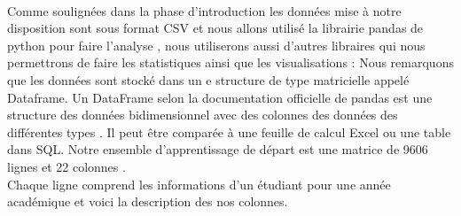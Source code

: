 \paragraph{}
Comme soulignées dans la phase d'introduction les données mise à notre
disposition sont sous format \ac {CSV} et nous allons utilisé la librairie pandas de python pour faire l'analyse , nous utiliserons aussi d'autres libraires qui nous permettrons de faire les statistiques ainsi que les visualisations :
Nous remarquons que les données sont stocké dans un e structure de type
matricielle appelé Dataframe. \cite{pedregosa2011scikit}
Un DataFrame selon la documentation officielle de pandas est une
structure des données bidimensionnel avec des colonnes des données des différentes types . Il peut être comparée à une feuille de calcul Excel ou une table dans \ac{SQL}.
Notre ensemble d'apprentissage de départ est une matrice de 9606 lignes et  22 colonnes .\\
Chaque ligne comprend les informations d'un étudiant pour une année académique et voici la description des nos colonnes.\\ 
